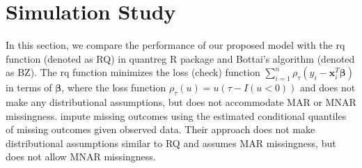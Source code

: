 \documentclass[12pt]{article}
\begin{document}


\section{Simulation Study}
\label{ch3:sec:simulation}
In this section,
we compare the performance of our proposed model with the rq function (denoted as RQ) in quantreg R package \citep{quantreg} and Bottai's algorithm \citep{bottai2013} (denoted as BZ).
The rq function minimizes the loss (check) function $\sum_{i=1}^n \rho_{\tau} (y_i - \bm x_i^T \bm \beta)$ in terms of $\bm \beta$,
where the loss function $\rho_{\tau} (u) = u(\tau - I(u < 0))$ and does not make any distributional assumptions, but does not accommodate MAR or MNAR missingness.
\citet{bottai2013} impute missing outcomes using the estimated conditional quantiles of missing outcomes given observed data.
Their approach does not make distributional assumptions similar to RQ and assumes MAR missingness, but does not allow MNAR missingness.
\end{document}
